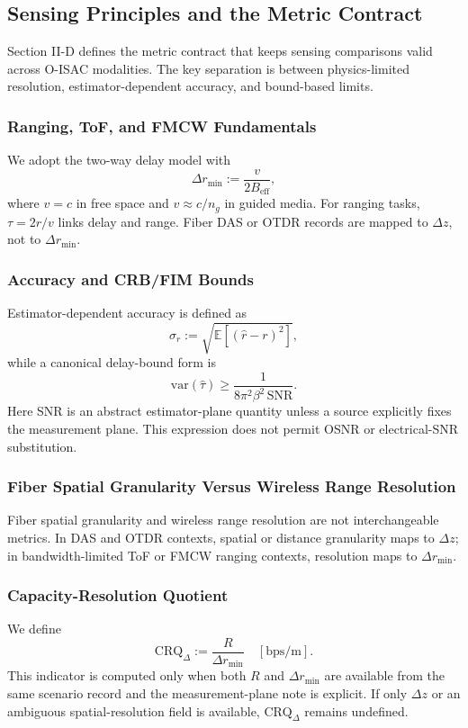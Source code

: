 \subsection{Sensing Principles and the Metric Contract}
Section II-D defines the metric contract that keeps sensing comparisons valid across O-ISAC modalities. The key separation is between physics-limited resolution, estimator-dependent accuracy, and bound-based limits.

\subsubsection{Ranging, ToF, and FMCW Fundamentals}
We adopt the two-way delay model with
\begin{equation}
\Delta r_{\min} := \frac{v}{2B_{\text{eff}}},
\end{equation}
where $v=c$ in free space and $v\approx c/n_g$ in guided media. For ranging tasks, $\tau=2r/v$ links delay and range. Fiber DAS or OTDR records are mapped to $\Delta z$, not to $\Delta r_{\min}$.

\subsubsection{Accuracy and CRB/FIM Bounds}
Estimator-dependent accuracy is defined as
\begin{equation}
\sigma_r := \sqrt{\mathbb{E}[(\hat r-r)^2]},
\end{equation}
while a canonical delay-bound form is
\begin{equation}
\mathrm{var}(\hat\tau) \ge \frac{1}{8\pi^2\beta^2\,\mathrm{SNR}}.
\end{equation}
Here SNR is an abstract estimator-plane quantity unless a source explicitly fixes the measurement plane. This expression does not permit OSNR or electrical-SNR substitution.

\subsubsection{Fiber Spatial Granularity Versus Wireless Range Resolution}
Fiber spatial granularity and wireless range resolution are not interchangeable metrics. In DAS and OTDR contexts, spatial or distance granularity maps to $\Delta z$; in bandwidth-limited ToF or FMCW ranging contexts, resolution maps to $\Delta r_{\min}$.

\subsubsection{Capacity-Resolution Quotient}
We define
\begin{equation}
\mathrm{CRQ}_{\Delta} := \frac{R}{\Delta r_{\min}} \quad [\mathrm{bps/m}].
\end{equation}
This indicator is computed only when both $R$ and $\Delta r_{\min}$ are available from the same scenario record and the measurement-plane note is explicit. If only $\Delta z$ or an ambiguous spatial-resolution field is available, $\mathrm{CRQ}_{\Delta}$ remains undefined.

